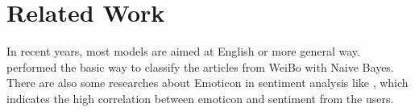 \chapter{Related Work}

In recent years, most models are aimed at English or more general way. \cite{zhao2012moodlens} performed the basic way to classify the articles from WeiBo with Naive Bayes.  \\

There are also some researches about Emoticon in sentiment analysis like \cite{Emojis}, which indicates the high correlation between emoticon and sentiment from the users.